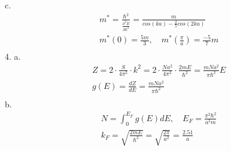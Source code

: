 \documentclass[UTF8]{ctexart}
\begin{document}
c.
\begin{equation*}
    \begin{aligned}
        & m^*=\frac{\hbar^2}{\frac{\partial^2E}{\partial k^2}}=\frac{m}{cos(ka)-\frac{2}{5}cos(2ka)}\\
        & m^*(0)=\frac{5m}{3},\quad m^*(\frac{\pi}{a})=\frac{-5}{7}m\\
    \end{aligned}
\end{equation*}
4.
a.
\begin{equation*}
    \begin{aligned}
        & Z=2\cdot\frac{S}{4\pi^2}\cdot k^2=2\cdot\frac{Na^2}{4\pi^2}\cdot\frac{2mE}{\hbar^2}
        =\frac{mNa^2}{\pi\hbar^2}E\\
        & g(E)=\frac{dZ}{dE}=\frac{mNa^2}{\pi\hbar^2}\\
    \end{aligned}
\end{equation*}
b.
\begin{equation*}
    \begin{aligned}
        &N=\int_0^{E_F}g(E)dE,\quad E_F=\frac{\pi^2\hbar^2}{a^2m}\\
        &k_F=\sqrt{\frac{2mE}{\hbar^2}}=\sqrt{\frac{2\pi}{a^2}}=\frac{2.51}{a}\\
    \end{aligned}
\end{equation*}
\end{document}
